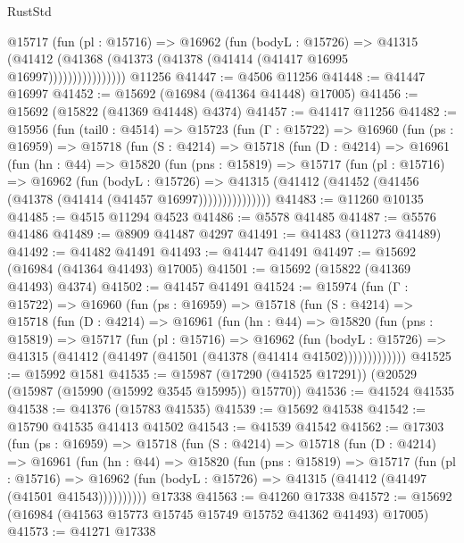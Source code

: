 \begin{lexlean}{RustStd}
\begin{coremodule}
                  @15717
                    (fun (pl : @15716) =>
                    @16962
                      (fun (bodyL : @15726) =>
                      @41315
                        (@41412
                          (@41368 (@41373 (@41378 (@41414 (@41417 @16995 @16997))))))))))))))))
    @11256
@41447 := @4506 @11256
@41448 := @41447 @16997
@41452 := @15692 (@16984 (@41364 @41448) @17005)
@41456 := @15692 (@15822 (@41369 @41448) @4374)
@41457 := @41417 @11256
@41482 := @15956
    (fun (tail0 : @4514) =>
    @15723
      (fun (Γ : @15722) =>
      @16960
        (fun (ps : @16959) =>
        @15718
          (fun (S : @4214) =>
          @15718
            (fun (D : @4214) =>
            @16961
              (fun (hn : @44) =>
              @15820
                (fun (pns : @15819) =>
                @15717
                  (fun (pl : @15716) =>
                  @16962
                    (fun (bodyL : @15726) =>
                    @41315 (@41412 (@41452 (@41456 (@41378 (@41414 (@41457 @16997)))))))))))))))
@41483 := @11260 @10135
@41485 := @4515 @11294 @4523
@41486 := @5578 @41485
@41487 := @5576 @41486
@41489 := @8909 @41487 @4297
@41491 := @41483 (@11273 @41489)
@41492 := @41482 @41491
@41493 := @41447 @41491
@41497 := @15692 (@16984 (@41364 @41493) @17005)
@41501 := @15692 (@15822 (@41369 @41493) @4374)
@41502 := @41457 @41491
@41524 := @15974
    (fun (Γ : @15722) =>
    @16960
      (fun (ps : @16959) =>
      @15718
        (fun (S : @4214) =>
        @15718
          (fun (D : @4214) =>
          @16961
            (fun (hn : @44) =>
            @15820
              (fun (pns : @15819) =>
              @15717
                (fun (pl : @15716) =>
                @16962
                  (fun (bodyL : @15726) =>
                  @41315 (@41412 (@41497 (@41501 (@41378 (@41414 @41502)))))))))))))
@41525 := @15992 @1581
@41535 := @15987 (@17290 (@41525 @17291)) (@20529 (@15987 (@15990 (@15992 @3545 @15995)) @15770))
@41536 := @41524 @41535
@41538 := @41376 (@15783 @41535)
@41539 := @15692 @41538
@41542 := @15790 @41535 @41413 @41502
@41543 := @41539 @41542
@41562 := @17303
    (fun (ps : @16959) =>
    @15718
      (fun (S : @4214) =>
      @15718
        (fun (D : @4214) =>
        @16961
          (fun (hn : @44) =>
          @15820
            (fun (pns : @15819) =>
            @15717
              (fun (pl : @15716) =>
              @16962 (fun (bodyL : @15726) => @41315 (@41412 (@41497 (@41501 @41543))))))))))
    @17338
@41563 := @41260 @17338
@41572 := @15692 (@16984 (@41563 @15773 @15745 @15749 @15752 @41362 @41493) @17005)
@41573 := @41271 @17338

\end{coremodule}
\end{lexlean}
